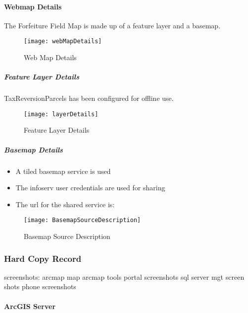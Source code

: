  \paragraph{Webmap Details}The Forfeiture Field Map is made up of a feature layer and a basemap.
 \begin{figure}[h!]
 \centering
     \texttt{[image: webMapDetails]}
 \vspace{-.25in}

 \caption{Web Map Details}
 \end{figure}
 \subparagraph{Feature Layer Details}TaxReversionParcels has been configured for offline use.
 \begin{figure}[h!]
 \centering
     \texttt{[image: layerDetails]}
 \vspace{-.15in}

 \caption{Feature Layer Details}
 \end{figure}
 \clearpage
 \subparagraph{Basemap Details}
 \begin{itemize}
   \setlength\itemsep{.3in}
   \item A tiled basemap service is used
   \item The infoserv user credentials are used for sharing
   \item The url for the shared service is:
 \end{itemize}

\noindent \textcolor{HyperlinkBlue1}{\scriptsize{}}
\vspace{.5in}

 \begin{figure}[h!]
 \centering
 \texttt{[image: BasemapSourceDescription]}
 \caption{Basemap Source Description}
 \end{figure}
 \clearpage
 \subsubsection{Hard Copy Record}
 screenshots:
 arcmap map
 arcmap tools
 portal screenshots
 sql server mgt screen shots
 phone screenshots
 \paragraph{ArcGIS Server}
 \clearpage
